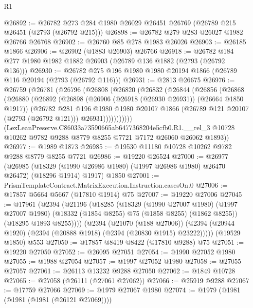 \begin{lexlean}{R1}
\begin{coremodule}
@26892 := @26782 @273 @284 @1980 @26029 @26451 @26769 (@26789 @215 @26451 (@2793 (@26792 @215)))
@26898 := @26782 @279 @283 @26027 @1982 @26766 @26768
@26902 := @26760 @85 @278 @1983 @26026
@26903 := @26185 @1866
@26906 := @26902 (@1883 @26903) @26766
@26918 := @26782 @184 @277 @1980 @1982 @1882 @26903 (@26789 @136 @1882 (@2793 (@26792 @136)))
@26930 := @26782 @275 @196 @1980 @1980 @20194 @1866 (@26789 @116 @20194 (@2793 (@26792 @116)))
@26931 := @2813 @26675
@26976 := @26759
    (@26781
      (@26796
        (@26808
          (@26820
            (@26832
              (@26844
                (@26856
                  (@26868
                    (@26880
                      (@26892
                        (@26898
                          (@26906 (@26918 (@26930 @26931)) (@26664 @1850 @1917))
                          (@26782
                            @281
                            @196
                            @1980
                            @1980
                            @20107
                            @1866
                            (@26789 @121 @20107 (@2793 (@26792 @121)))
                            @26931)))))))))))
      (LexLeanPreserve.C86033a73590665ab6477368204e5cfb0.R1.__rel_3
        @10728
        @10262
        @9782
        @9288
        @8779
        @8255
        @7721
        @7172
        @26060
        @26062
        @1893))
@26977 := @1989 @1873
@26985 := @19530 @11180 @10728 @10262 @9782 @9288 @8779 @8255 @7721
@26986 := @19220 @26524
@27000 := @26977
    (@26985 (@18329 (@1990 @26986 @1980) (@1997 @26986 @1980) @26470 @26472) (@18296 @1914) @1917)
    @1850
@27001 := PrismTemplateContract.MatrixExecution.Instruction.casesOn.{0}
@27006 := @17857 @5664 @5667 (@17810 @1914) @75
@27007 := @19220 @27006
@27045 := @17961
    (@2394
      (@21196
        (@18285
          (@18329
            (@1990 @27007 @1980)
            (@1997 @27007 @1980)
            (@18332 (@1854 @8255) @75 (@1858 @8255) (@1862 @8255))
            (@18295 @1893 @8255))))
      (@2394
        (@21070 (@188 @27006))
        (@2394 (@20944 @1920) (@2394 (@20888 @1918) (@2394 (@20830 @1915) @23222)))))
    (@19529 @1850)
    @553
@27050 := @17857 @8419 @8422 (@17810 @9288) @75
@27051 := @19220 @27050
@27052 := @26095 @27051
@27054 := @1990 @27052 @1980
@27055 := @1988 @27054
@27057 := @1997 @27052 @1980
@27058 := @27055 @27057
@27061 := @26113 @13232 @9288 @27050
@27062 := @1849 @10728
@27065 := @27058 (@26111 (@27061 @27062))
@27066 := @25919 @9288
@27067 := @17759 @27066
@27069 := @1979 @27067 @1980
@27074 := @1979 (@1981 (@1981 (@1981 (@26121 @27069))))

\end{coremodule}
\end{lexlean}
